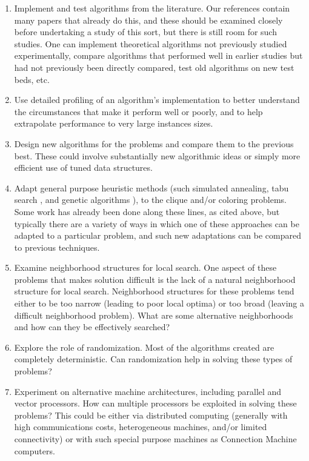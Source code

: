 \begin{enumerate}

\item Implement and test algorithms from the literature.
Our references contain many papers that already do this, and these
should be examined closely before undertaking a study of this sort, but
there is still room for such studies.  One can implement theoretical
algorithms not previously studied experimentally, compare algorithms
that performed well in earlier studies but had not previously been
directly compared, test old algorithms on new test beds, etc.

\item Use detailed profiling of an algorithm's implementation to better
understand the circumstances that make it perform well or poorly,
and to help extrapolate performance to very large instances sizes.

\item Design new algorithms for the problems and compare them to the
previous best.  These could involve substantially new algorithmic ideas
or simply more efficient use of tuned data structures.

\item Adapt general purpose heuristic methods (such
simulated annealing\cite{AaKo89,Ce85,CEG88,KGV83,VaAa87},
tabu search \cite{GL89,HeDe87},
and genetic algorithms \cite{Go89}),
to the clique and/or coloring problems.
Some work has already been done along these lines, as cited above,
but typically there are a variety of ways in which one of these approaches
can be adapted to a particular problem, and such new adaptations can
be compared to previous techniques.

\item Examine neighborhood structures for local search.  One aspect of
these problems
that makes solution difficult is the lack of a natural neighborhood
structure for local search.  Neighborhood structures for these
problems tend either to be too narrow (leading to poor local optima)
or too broad (leaving a difficult neighborhood problem).  What are
some alternative neighborhoods and how can they be effectively
searched?

\item Explore the role of randomization.  Most of the algorithms
created are completely deterministic.  Can randomization help in
solving these types of problems?

\item Experiment on alternative  machine architectures, including
parallel and vector processors.  How can multiple processors be
exploited in solving these problems?  This could be either via
distributed computing (generally with high communications costs,
heterogeneous machines, and/or limited connectivity) or with such
special purpose machines as Connection Machine computers.


\end{enumerate}
